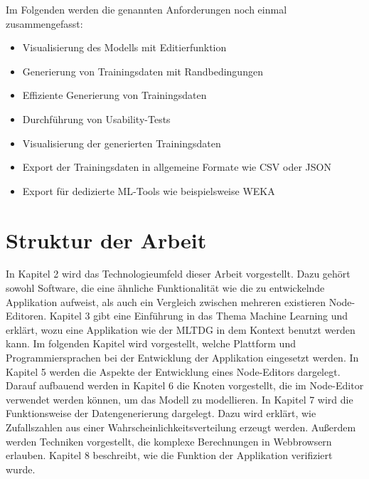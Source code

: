 Im Folgenden werden die genannten Anforderungen noch einmal zusammengefasst:
\begin{itemize}
    \item Visualisierung des Modells mit Editierfunktion
    \item Generierung von Trainingsdaten mit Randbedingungen
    \item Effiziente Generierung von Trainingsdaten
    \item Durchführung von Usability-Tests
    \item Visualisierung der generierten Trainingsdaten
    \item Export der Trainingsdaten in allgemeine Formate wie \ac{CSV} oder JSON 
    \item Export für dedizierte \ac{ML}-Tools wie beispielsweise WEKA
\end{itemize}

\section{Struktur der Arbeit}

In Kapitel 2 wird das Technologieumfeld dieser Arbeit vorgestellt. Dazu gehört sowohl Software, die eine ähnliche Funktionalität  wie die zu entwickelnde Applikation aufweist, als auch ein Vergleich zwischen mehreren existieren Node-Editoren. Kapitel 3 gibt eine Einführung in das Thema Machine Learning und erklärt, wozu eine Applikation wie der \ac{MLTDG} in dem Kontext benutzt werden kann. Im folgenden Kapitel wird vorgestellt, welche Plattform und Programmiersprachen bei der Entwicklung der Applikation eingesetzt werden. In Kapitel 5 werden die Aspekte der Entwicklung eines Node-Editors dargelegt. Darauf aufbauend werden in Kapitel 6 die Knoten vorgestellt, die im Node-Editor verwendet werden können, um das Modell zu modellieren. In Kapitel 7 wird die Funktionsweise der Datengenerierung dargelegt. Dazu wird erklärt, wie Zufallszahlen aus einer Wahrscheinlichkeitsverteilung erzeugt werden. Außerdem werden Techniken vorgestellt, die komplexe Berechnungen in Webbrowsern erlauben. Kapitel 8 beschreibt, wie die Funktion der Applikation verifiziert wurde.